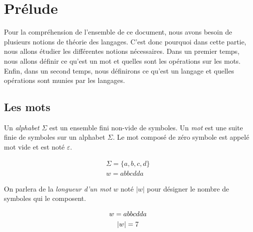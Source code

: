 \section{Prélude}

Pour la compréhension de l'ensemble de ce document, nous avons besoin de
plusieurs notions de théorie des langages. C'est donc pourquoi dans cette
partie, nous allons étudier les différentes notions nécessaires. Dans un
premier temps, nous allons définir ce qu'est un mot et quelles sont les
opérations sur les mots. Enfin, dans un second temps, nous définirons ce qu'est
un langage et quelles opérations sont munies par les langages.

\subsection{Les mots}

\begin{definition}
    Un \textit{alphabet} \(\Sigma\) est un ensemble fini non-vide de symboles.
    Un \textit{mot} est une suite finie de symboles sur un alphabet \(\Sigma\).
    Le mot composé de zéro symbole est appelé mot vide et est noté
    \(\varepsilon\).
\end{definition}

\begin{example}
    \begin{gather*}
        \Sigma = \{a, b, c, d\} \\
        w = abbcdda
    \end{gather*}
\end{example}

\begin{definition}
    On parlera de la \textit{longueur d'un mot} \(w\) noté \(|w|\) pour
    désigner le nombre de symboles qui le composent. %
\end{definition}

\begin{example}
    \begin{gather*}
        w = abbcdda \notag \\
        |w| = 7 \\
    \end{gather*}
\end{example}

